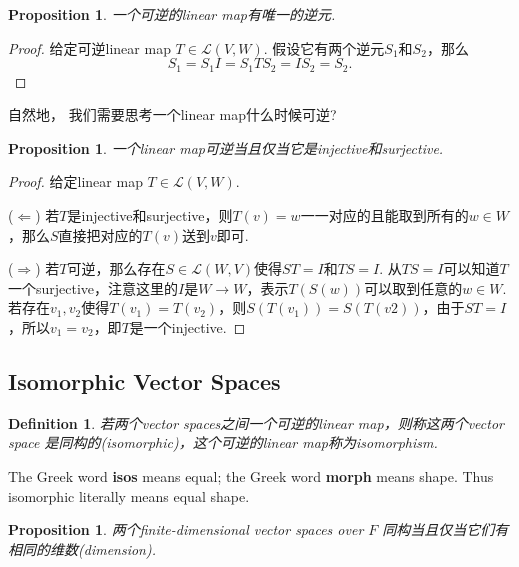 \documentclass{article}
\newtheorem{proposition}[theorem]{Proposition}
\newtheorem{definition}[theorem]{Definition}
\begin{document}
\begin{proposition}
\rm 一个可逆的linear map有唯一的逆元.
\end{proposition}

\begin{proof}
\rm 给定可逆linear map $T \in \mathcal{L}(V,W)$. 假设它有两个逆元$S_1$和$S_2$，那么
$$
S_1 = S_1I = S_1TS_2 = IS_2 =S_2.
$$
\end{proof}

自然地，{\color{red} 我们需要思考一个linear map什么时候可逆}?

\begin{proposition}
\rm 一个linear map可逆当且仅当它是injective和surjective.
\end{proposition}


\begin{proof}
给定linear map $T \in \mathcal{L}(V,W)$. 

($\Leftarrow$)  若$T$是injective和surjective，则$T(v) = w$一一对应的且能取到所有的$w \in W$，那么$S$直接把对应的$T(v)$送到$v$即可.

($\Rightarrow$) 若$T$可逆，那么存在$S \in \mathcal{L}(W,V)$使得$ST = I$和$TS = I$. 从$TS = I$可以知道$T$一个surjective，注意这里的$I$是$W \rightarrow W$，表示$T(S(w))$可以取到任意的$w \in W$. 若存在$v_1,v_2$使得$T(v_1) = T(v_2)$，则$S(T(v_1)) = S(T(v2))$，由于$ST = I$，所以$v_1 = v_2$，即$T$是一个injective. 
\end{proof}

\newpage
\subsection{Isomorphic Vector Spaces}

\begin{definition}
\rm 若两个vector spaces之间一个可逆的linear map，则称这两个vector space 是同构的(isomorphic)，这个可逆的linear map称为isomorphism.
\end{definition}

{\color{blue} The Greek word \textbf{isos} means equal; the Greek word \textbf{morph} means shape. Thus isomorphic literally means equal shape}.

\begin{proposition}
\rm 两个finite-dimensional vector spaces over $F$ 同构当且仅当它们有相同的维数(dimension).
\end{proposition}
\end{document}

